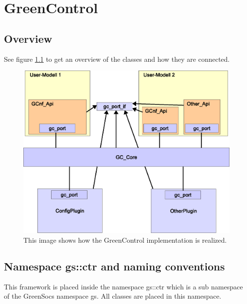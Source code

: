 
\cleardoublepage

\chapter{GreenControl}
\label{GreenControl}

\section{Overview}

See figure \ref{fig:GreenControlImpl} to get an overview of the \GreenControl classes and how they are connected.

\begin{figure}%
	\centerline{
	\includegraphics[width=\textwidth]{GreenControlImpl3.eps}
	} 
	\caption{This image shows how the GreenControl implementation is realized. }
	\label{fig:GreenControlImpl}
\end{figure}


\section{Namespace gs::ctr and naming conventions}
\label{GreenControlNamespaceAndConventions}
This framework is placed inside the namespace {\sffamily gs::ctr} which is a sub namespace of the GreenSocs namespace {\sffamily gs}. All \GreenControl classes are placed in this namespace.

